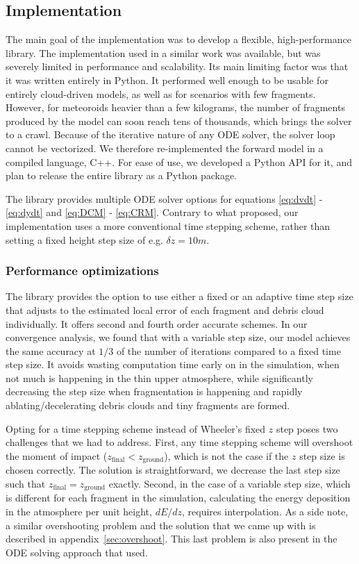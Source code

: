 \subsection{Implementation}
The main goal of the implementation was to develop a flexible, high-performance library. The implementation used in a similar work \citep{newland2019CFM18} was available, but was severely limited in performance and scalability. Its main limiting factor was that it was written entirely in Python. It performed well enough to be usable for entirely cloud-driven models, as well as for scenarios with few fragments. However, for meteoroids heavier than a few kilograms, the number of fragments produced by the model can soon reach tens of thousands, which brings the solver to a crawl. Because of the iterative nature of any ODE solver, the solver loop cannot be vectorized.
We therefore re-implemented the forward model in a compiled language, C++.
For ease of use, we developed a Python API for it, and plan to release the entire library as a Python package.

The library provides multiple ODE solver options for equations \ref{eq:dvdt} - \ref{eq:dydt} and \ref{eq:DCM} - \ref{eq:CRM}.
Contrary to what \cite{wheeler2017fragmentcloud} proposed, our implementation uses a more conventional time stepping scheme, rather than setting a fixed height step size of e.g. $\delta z = 10\unit{m}$.

\subsubsection{Performance optimizations}
The library provides the option to use either a fixed or an adaptive time step size that adjusts to the estimated local error of each fragment and debris cloud individually. It offers second and fourth order accurate schemes. In our convergence analysis, we found that with a variable step size, our model achieves the same accuracy at $1/3$ of the number of iterations compared to a fixed time step size. It avoids wasting computation time early on in the simulation, when not much is happening in the thin upper atmosphere, while significantly decreasing the step size when fragmentation is happening and rapidly ablating/decelerating debris clouds and tiny fragments are formed.

Opting for a time stepping scheme instead of Wheeler's fixed $z$ step poses two challenges that we had to address. First, any time stepping scheme will overshoot the moment of impact ($z_\mathrm{final} < z_\mathrm{ground}$), which is not the case if the $z$ step size is chosen correctly. The solution is straightforward, we decrease the last step size such that $z_\mathrm{final} = z_\mathrm{ground}$ exactly. Second, in the case of a variable step size, which is different for each fragment in the simulation, calculating the energy deposition in the atmosphere per unit height, $dE/dz$, requires interpolation. As a side note, a similar overshooting problem and the solution that we came up with is described in appendix~\ref{sec:overshoot}. This last problem is also present in the ODE solving approach that \cite{wheeler2017fragmentcloud} used.

